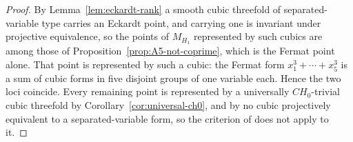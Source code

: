 \begin{proof}
By Lemma~\ref{lem:eckardt-rank} a smooth cubic threefold of
separated-variable type carries an Eckardt point, and carrying one is
invariant under projective equivalence, so the points of \(M_{H_1}\)
represented by such cubics are among those of
Proposition~\ref{prop:A5-not-coprime}, which is the Fermat point alone.  That
point is represented by such a cubic: the Fermat form
\(x_1^3+\cdots+x_5^3\) is a sum of cubic forms in five disjoint groups of one
variable each.  Hence the two loci coincide.  Every remaining point is
represented by a universally \(CH_0\)-trivial cubic threefold by
Corollary~\ref{cor:universal-ch0}, and by no cubic projectively equivalent to
a separated-variable form, so the criterion of \cite{CT} does not apply to
it.
%
\end{proof}

